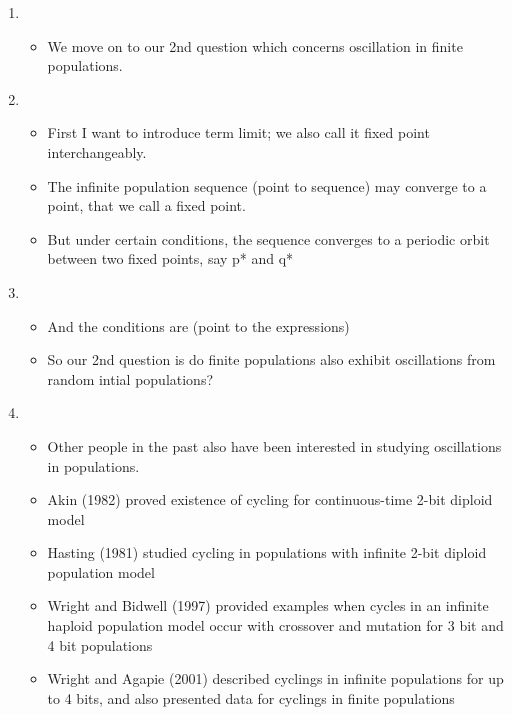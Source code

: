 \documentclass{article}
\begin{document}
\begin{enumerate}
    
\item 
  \begin{itemize}
  \item We move on to our 2nd question which concerns oscillation in
    finite populations.
  \end{itemize}
    
\item
  \begin{itemize}
  \item First I want to introduce term limit; we also call it fixed
    point interchangeably.
  \item The infinite population sequence (point to sequence) may
    converge to a point, that we call a fixed point.
  \item But under certain conditions, the sequence converges to a
    periodic orbit between two fixed points, say p* and q*
\end{itemize}

\item
  \begin{itemize}
  \item And the conditions are (point to the expressions)
  \item So our 2nd question is do finite populations also exhibit
     oscillations from random intial populations?
  \end{itemize}
    
\item
  \begin{itemize}
  \item Other people in the past also have been interested in studying
    oscillations in populations.
   \item Akin (1982) proved existence of cycling for continuous-time
     2-bit diploid model
  \item Hasting (1981) studied cycling in populations with infinite
    2-bit diploid population model
  \item Wright and Bidwell (1997) provided examples when cycles in an
    infinite haploid population model occur with crossover and
    mutation for 3 bit and 4 bit populations
  \item Wright and Agapie (2001) described cyclings in infinite
    populations for up to 4 bits, and also presented data for cyclings
    in finite populations
  \end{itemize}


\end{enumerate}
\end{document}
